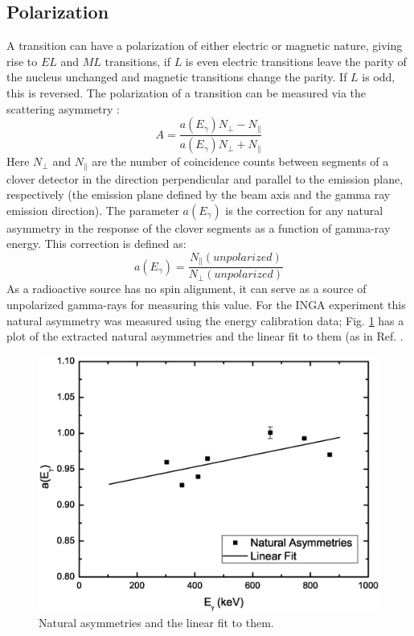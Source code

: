 \subsection{Polarization}
\label{ssec:exp-pol}
A transition can have a polarization of either electric or magnetic nature, giving rise to $EL$ and $ML$ transitions, if $L$ is even electric transitions leave the parity of the nucleus unchanged and magnetic transitions change the parity. If $L$ is odd, this is reversed. The polarization of a transition can be measured via the scattering asymmetry \cite{expPolDCO}:
\begin{equation}
\label{eqn:chp3-scat-asym}
A=\frac{a(E_{\gamma})N_{\perp}-N_{\parallel}}{a(E_{\gamma})N_{\perp}+N_{\parallel}}
\end{equation}
Here $N_{\perp}$ and $N_{\parallel}$ are the number of coincidence counts between segments of a clover detector in the direction perpendicular and parallel to the emission plane, respectively (the emission plane defined by the beam axis and the gamma ray emission direction). The parameter $a(E_{\gamma})$ is the correction for any natural asymmetry in the response of the clover segments as a function of gamma-ray energy. This correction is defined as:
\begin{equation}
\label{eqn:chp3-nat-asym-corr}
a(E_{\gamma})=\frac{N_{\parallel}(unpolarized)}{N_{\perp}(unpolarized)}
\end{equation}
As a radioactive source has no spin alignment, it can serve as a source of unpolarized gamma-rays for measuring this value. For the INGA experiment this natural asymmetry was measured using the energy calibration data; Fig. \ref{fig:chp3-nat-asyms} has a plot of the extracted natural asymmetries and the linear fit to them (as in Ref. \cite{expPolDCO}.
\begin{figure}[ht!]
	\centerline{\includegraphics[height=0.35\textheight]{./img/c3/naturalAsymPlot.eps}}
	\caption{Natural asymmetries and the linear fit to them. \label{fig:chp3-nat-asyms}}
\end{figure}
